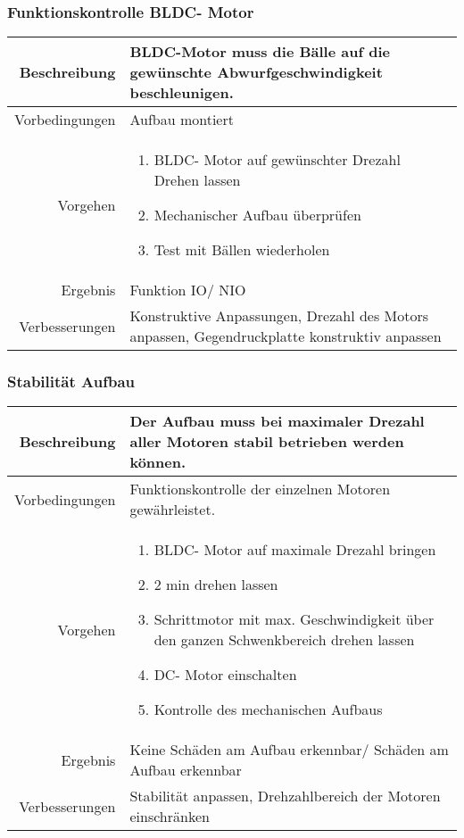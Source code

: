 \subsubsection{Funktionskontrolle BLDC- Motor}
\begin{table}[h!]
	\renewcommand{\arraystretch}{1.5}
	\begin{tabular}{|r|p{14cm}|}
		\hline Beschreibung & BLDC-Motor muss die Bälle auf die gewünschte Abwurfgeschwindigkeit beschleunigen.  \\ 
		\hline Vorbedingungen & Aufbau montiert \\ 
		\hline Vorgehen & 
		\begin{enumerate}
			\item BLDC- Motor auf gewünschter Drezahl Drehen lassen 
			\item Mechanischer Aufbau überprüfen
			\item Test mit Bällen wiederholen 
		\end{enumerate} \\ 
		\hline Ergebnis & Funktion IO/ NIO \\ 
		\hline Verbesserungen & Konstruktive Anpassungen, Drezahl des Motors anpassen, Gegendruckplatte konstruktiv anpassen \\ 
		\hline 
	\end{tabular}
\end{table}

\subsubsection{Stabilität Aufbau}
\begin{table}[h!]
	\renewcommand{\arraystretch}{1.5}
	\begin{tabular}{|r|p{14cm}|}
		\hline Beschreibung & Der Aufbau muss bei maximaler Drezahl aller Motoren stabil betrieben werden können. \\ 
		\hline Vorbedingungen & Funktionskontrolle der einzelnen Motoren gewährleistet. \\ 
		\hline Vorgehen & 
		\begin{enumerate}
			\item BLDC- Motor auf maximale Drezahl bringen
			\item 2 min drehen lassen 
			\item Schrittmotor mit max. Geschwindigkeit über den ganzen Schwenkbereich drehen lassen  
			\item DC- Motor einschalten
			\item Kontrolle des mechanischen Aufbaus
		\end{enumerate} \\ 
		\hline Ergebnis & Keine Schäden am Aufbau erkennbar/ Schäden am Aufbau erkennbar \\ 
		\hline Verbesserungen & Stabilität anpassen, Drehzahlbereich der Motoren einschränken \\ 
		\hline 
	\end{tabular}
\end{table}
\newpage

